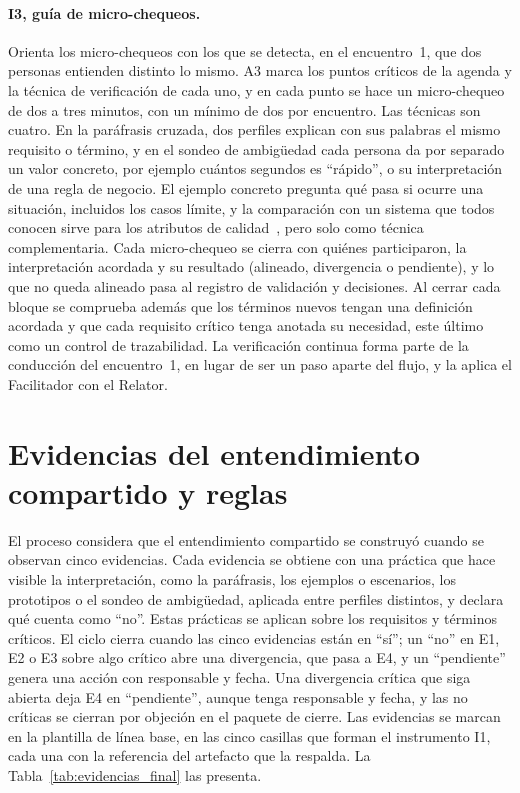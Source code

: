 \documentclass[12pt,letterpaper,oneside]{report}
\begin{document}
\paragraph{I3, guía de micro-chequeos.}
Orienta los micro-chequeos con los que se detecta, en el encuentro~1, que dos
personas entienden distinto lo mismo. A3 marca los puntos críticos de la agenda
y la técnica de verificación de cada uno, y en cada punto se hace un
micro-chequeo de dos a tres minutos, con un mínimo de dos por encuentro. Las
técnicas son cuatro. En la paráfrasis cruzada, dos perfiles explican con sus
palabras el mismo requisito o término, y en el sondeo de ambigüedad cada persona
da por separado un valor concreto, por ejemplo cuántos segundos es ``rápido'', o
su interpretación de una regla de negocio. El ejemplo concreto pregunta qué pasa
si ocurre una situación, incluidos los casos límite, y la comparación con un
sistema que todos conocen sirve para los atributos de
calidad~\cite{glinz2015shared}, pero solo como técnica complementaria. Cada
micro-chequeo se cierra con quiénes participaron, la interpretación acordada y
su resultado (alineado, divergencia o pendiente), y lo que no queda alineado
pasa al registro de validación y decisiones. Al cerrar cada bloque se comprueba
además que los términos nuevos tengan una definición acordada y que cada
requisito crítico tenga anotada su necesidad, este último como un control de
trazabilidad. La verificación continua forma parte de la conducción del encuentro~1, en lugar
de ser un paso aparte del flujo, y la aplica el Facilitador con el Relator.

\section{Evidencias del entendimiento compartido y reglas}
\label{sec:evidencias_final}
El proceso considera que el entendimiento compartido se construyó cuando se
observan cinco evidencias. Cada evidencia se obtiene con una práctica que hace
visible la interpretación, como la paráfrasis, los ejemplos o escenarios, los
prototipos o el sondeo de ambigüedad, aplicada entre perfiles distintos, y
declara qué cuenta como ``no''. Estas prácticas se aplican sobre los requisitos y términos críticos. El
ciclo cierra cuando las cinco evidencias están en ``sí''; un ``no'' en E1, E2 o
E3 sobre algo crítico abre una divergencia, que pasa a E4, y un ``pendiente''
genera una acción con responsable y fecha. Una divergencia crítica que siga
abierta deja E4 en ``pendiente'', aunque tenga responsable y fecha, y las no
críticas se cierran por objeción en el paquete de cierre. Las evidencias se marcan en la plantilla de línea base, en las cinco casillas
que forman el instrumento I1, cada una con la referencia del artefacto que la
respalda.
La Tabla~\ref{tab:evidencias_final} las presenta.
\end{document}
